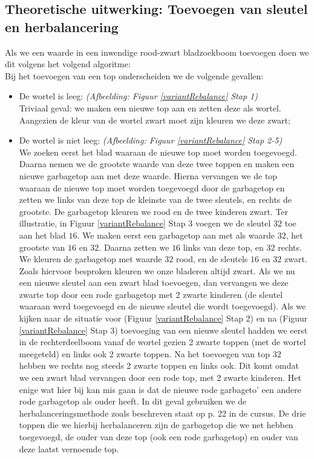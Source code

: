 \documentclass[11pt,a4paper]{report}
\begin{document}
\subsection{Theoretische uitwerking: Toevoegen van sleutel en herbalancering}
\label{theorem: toevoegen van sleutel en herbalancering}
Als we een waarde in een inwendige rood-zwart bladzoekboom toevoegen doen we dit volgens het volgend algoritme:\\
Bij het toevoegen van een top onderscheiden we de volgende gevallen:
\begin{itemize}
\item De wortel is leeg: \textsl{(Afbeelding: Figuur \ref{variantRebalance} Stap 1)}\\
Triviaal geval: we maken een nieuwe top aan en zetten deze als wortel. Aangezien de kleur van de wortel zwart moet zijn kleuren we deze zwart;
\item De wortel is niet leeg: \textsl{(Afbeelding: Figuur \ref{variantRebalance} Stap 2-5)}\\
We zoeken eerst het blad waaraan de nieuwe top moet worden toegevoegd. Daarna nemen we de grootste waarde van deze twee toppen en maken een nieuwe garbagetop aan met deze waarde. Hierna vervangen we de top waaraan de nieuwe top moet worden toegevoegd door de garbagetop en zetten we links van deze top de kleinste van de twee sleutels, en rechts de grootste. 
De garbagetop kleuren we rood en de twee kinderen zwart. Ter illustratie, in Figuur \ref{variantRebalance} Stap 3 voegen we de sleutel $32$ toe aan het blad $16$. We maken eerst een garbagetop aan met als waarde $32$, het grootste van $16$ en $32$. Daarna zetten we $16$ links van deze top, en $32$ rechts. We kleuren de garbagetop met waarde $32$ rood, en de sleutels $16$ en $32$ zwart.\\
Zoals hiervoor besproken kleuren we onze bladeren altijd zwart. Als we nu een nieuwe sleutel aan een zwart blad toevoegen, dan vervangen we deze zwarte top door een rode garbagetop met 2 zwarte kinderen (de sleutel waaraan werd toegevoegd en de nieuwe sleutel die wordt toegevoegd). Als we kijken naar de situatie voor (Figuur \ref{variantRebalance} Stap 2) en na (Figuur \ref{variantRebalance} Stap 3) toevoeging van een nieuwe sleutel hadden we eerst in de rechterdeelboom vanaf de wortel gezien 2 zwarte toppen (met de wortel meegeteld) en links ook 2 zwarte toppen. Na het toevoegen van top $32$ hebben we rechts nog steeds 2 zwarte toppen en links ook. Dit komt omdat we een zwart blad vervangen door een rode top, met 2 zwarte kinderen. Het enige wat hier bij kan mis gaan is dat de nieuwe rode garbageto' een andere rode garbagetop als ouder heeft. In dit geval gebruiken we de herbalanceringsmethode zoals beschreven staat op p. 22 in de cursus. De drie toppen die we hierbij herbalanceren zijn de garbagetop die we net hebben toegevoegd, de ouder van deze top (ook een rode garbagetop) en ouder van deze laatst vernoemde top.
\end{itemize}
\end{document}
